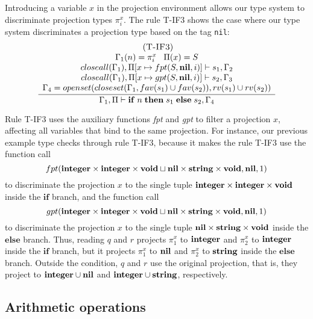 Introducing a variable $x$ in the projection environment allows our
type system to discriminate projection types $\pi_{i}^{x}$.
The rule \textsc{T-IF3} shows the case where our type system
discriminates a projection type based on the tag \texttt{nil}:
\[
\begin{array}{c}
\; (\textsc{T-IF3})\\
\dfrac{\begin{array}{c}
       \Gamma_{1}(n) = \pi_{i}^{x} \;\;\; \Pi(x) = S\\
       closeall(\Gamma_{1}), \Pi[x \mapsto fpt(S,\mathbf{nil},i)] \vdash s_{1}, \Gamma_{2} \\
       closeall(\Gamma_{1}), \Pi[x \mapsto gpt(S,\mathbf{nil},i)] \vdash s_{2}, \Gamma_{3} \\
       \Gamma_{4} = openset(closeset(\Gamma_{1}, fav(s_{1}) \cup fav(s_{2})),rv(s_{1}) \cup rv(s_{2}))
      \end{array}}
      {\Gamma_{1}, \Pi \vdash \mathbf{if} \; n \; \mathbf{then} \; s_{1} \; \mathbf{else} \; s_{2}, \Gamma_{4}}
\end{array}
\]

Rule \textsc{T-IF3} uses the auxiliary functions \emph{fpt} and \emph{gpt}
to filter a projection $x$, affecting all variables that bind to the same projection.
For instance, our previous example type checks through rule \textsc{T-IF3},
because it makes the rule \textsc{T-IF3} use the function call
\[
fpt(\mathbf{integer} \times \mathbf{integer} \times \mathbf{void} \sqcup \mathbf{nil} \times \mathbf{string} \times \mathbf{void}, \mathbf{nil}, 1)
\]
to discriminate the projection $x$ to the single tuple
$\mathbf{integer} \times \mathbf{integer} \times \mathbf{void}$ inside the $\mathbf{if}$ branch,
and the function call
\[
gpt(\mathbf{integer} \times \mathbf{integer} \times \mathbf{void} \sqcup \mathbf{nil} \times \mathbf{string} \times \mathbf{void}, \mathbf{nil}, 1)
\]
to discriminate the projection $x$ to the single tuple
$\mathbf{nil} \times \mathbf{string} \times \mathbf{void}$ inside the $\mathbf{else}$ branch.
Thus, reading $q$ and $r$ projects $\pi_{1}^{x}$ to $\mathbf{integer}$ and
$\pi_{2}^{x}$ to $\mathbf{integer}$ inside the $\mathbf{if}$ branch,
but it projects $\pi_{1}^{x}$ to $\mathbf{nil}$ and $\pi_{2}^{x}$ to $\mathbf{string}$
inside the $\mathbf{else}$ branch.
Outside the condition, $q$ and $r$ use the original projection, that is,
they project to $\mathbf{integer} \cup \mathbf{nil}$ and $\mathbf{integer} \cup \mathbf{string}$, respectively.

\subsection{Arithmetic operations}
\label{sec:arith}

